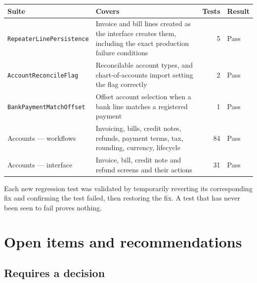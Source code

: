 \documentclass[11pt,a4paper]{article}
\newcommand{\acct}[1]{\texttt{\small #1}}
\begin{document}
\begin{center}
\small
\begin{tabularx}{\textwidth}{@{}l X r l@{}}
\toprule
\textbf{Suite} & \textbf{Covers} & \textbf{Tests} & \textbf{Result}\\
\midrule
\acct{RepeaterLinePersistence} & Invoice and bill lines created as the interface creates them,
  including the exact production failure conditions & 5 & Pass\\
\addlinespace
\acct{AccountReconcileFlag} & Reconcilable account types, and chart-of-accounts import setting the
  flag correctly & 2 & Pass\\
\addlinespace
\acct{BankPaymentMatchOffset} & Offset account selection when a bank line matches a registered
  payment & 1 & Pass\\
\addlinespace
Accounts --- workflows & Invoicing, bills, credit notes, refunds, payment terms, tax, rounding,
  currency, lifecycle & 84 & Pass\\
\addlinespace
Accounts --- interface & Invoice, bill, credit note and refund screens and their actions & 31 & Pass\\
\bottomrule
\end{tabularx}
\end{center}

\vspace{6pt}
Each new regression test was validated by temporarily reverting its corresponding fix and confirming
the test failed, then restoring the fix. A test that has never been seen to fail proves nothing.

\section{Open items and recommendations}

\subsection{Requires a decision}
\end{document}
